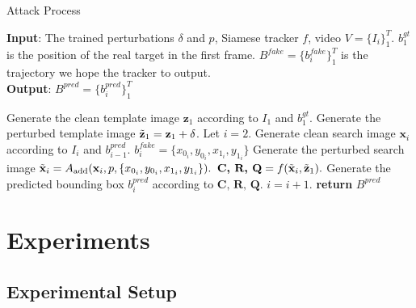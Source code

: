 \documentclass[journal]{IEEEtran}
\begin{document}
\begin{algorithm}[tb]
  \caption{Attack Process}
  \label{alg:algorithm_attack}
  \textbf{Input}: The trained perturbations $\delta$ and $p$, Siamese tracker $f$, video $V=\{I_i\}_1^T$. $b^{gt}_1$ is the position of the real target in the first frame. $B^{fake}=\{b^{fake}_i\}_1^{T}$ is the trajectory we hope the tracker to output.\\
  \textbf{Output}: $B^{pred}=\{b^{pred}_i\}_1^{T}$
  \begin{algorithmic}[1] %
    \STATE Generate the clean template image $\textbf{z}_1$ according to $I_1$ and $b^{gt}_1$.
    \STATE Generate the perturbed template image $\tilde{\textbf z}_1=\textbf z_1+\delta$.
    \STATE Let $i = 2$.
  \STATE Generate clean search image $\textbf{x}_i$ according to $I_i$ and $b^{pred}_{i-1}$.
  \STATE $b^{fake}_i=\{x_{0_i}, y_{0_i}, x_{1_i}, y_{1_i}\}$
  \STATE Generate the perturbed search image $\tilde{\textbf x}_i = A_{\text{add}}(\textbf x_i, p, \{x_{0_i}, y_{0_i}, x_{1_i}, y_{1_i}\}).$
  \STATE $\textbf{C, R, Q} = f(\tilde {\textbf x}_i, \tilde{\textbf z}_1).$
  \STATE Generate the predicted bounding box $b^{pred}_i$ according to $\textbf{C, R, Q}$.
  \STATE $i = i + 1.$
  \ENDWHILE
  \STATE \textbf{return} $B^{pred}$
  \end{algorithmic}
\end{algorithm}

\section{Experiments}

\subsection{Experimental Setup}
\end{document}
